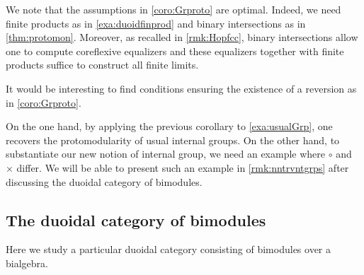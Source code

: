 \documentclass[nosumlimits,twoside]{amsart}
\theoremstyle{definition}
\theoremstyle{remark}
\newcommand{\Cc}{\mathcal{C}}
\begin{document}
We note that the assumptions in \cref{coro:Grproto} are optimal. Indeed, we need finite products as in \cref{exa:duoidfinprod} and binary intersections as in  \cref{thm:protomon}.
Moreover, as recalled in \cref{rmk:Hopfcc},
binary intersections allow one to compute coreflexive equalizers and  these equalizers together with finite products suffice to construct all finite limits.

It would be interesting to find conditions ensuring the existence of a reversion as in \cref{coro:Grproto}.\medskip

On the one hand, by applying the previous corollary to \cref{exa:usualGrp}, one recovers the protomodularity of usual internal groups. On the other hand, to substantiate our new notion of internal group, we need an example where $\circ$ and $\times$ differ. We will be able to present such an example in \cref{rmk:nntrvntgrps} after discussing the duoidal category of bimodules.


\subsection{The duoidal category of bimodules}
Here we study a particular duoidal category consisting of bimodules over a bialgebra.
\end{document}
